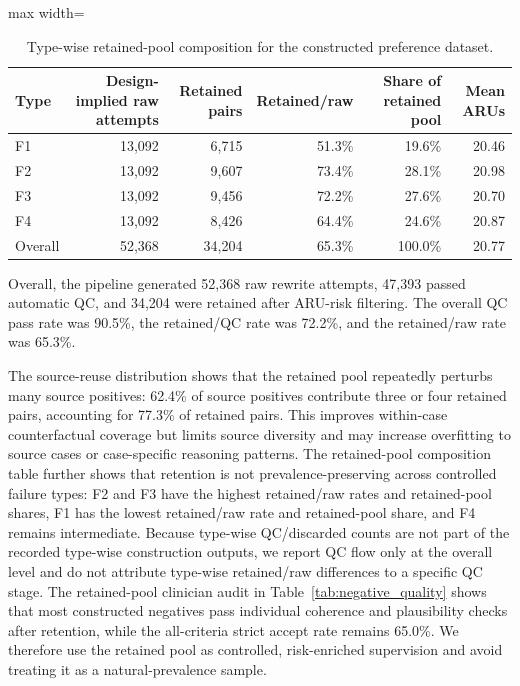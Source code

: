 \documentclass[a4paper,fleqn,doubleblind]{cas-sc}
\begin{document}
\begin{table}[htbp]
    \centering
    \footnotesize
    \caption{Type-wise retained-pool composition for the constructed preference dataset.}
    \label{tab:dataset_bias_retention}
    \begin{adjustbox}{max width=\textwidth}
    \begin{tabular}{lrrrrr}
        \toprule
        \textbf{Type} & \textbf{Design-implied raw attempts} & \textbf{Retained pairs} & \textbf{Retained/raw} & \textbf{Share of retained pool} & \textbf{Mean ARUs} \\
        \midrule
        F1 & 13,092 & 6,715 & 51.3\% & 19.6\% & 20.46 \\
        F2 & 13,092 & 9,607 & 73.4\% & 28.1\% & 20.98 \\
        F3 & 13,092 & 9,456 & 72.2\% & 27.6\% & 20.70 \\
        F4 & 13,092 & 8,426 & 64.4\% & 24.6\% & 20.87 \\
        \midrule
        Overall & 52,368 & 34,204 & 65.3\% & 100.0\% & 20.77 \\
        \bottomrule
    \end{tabular}
    \end{adjustbox}
\end{table}

Overall, the pipeline generated 52,368 raw rewrite attempts, 47,393 passed automatic QC, and 34,204 were retained after ARU-risk filtering. The overall QC pass rate was 90.5\%, the retained/QC rate was 72.2\%, and the retained/raw rate was 65.3\%.

The source-reuse distribution shows that the retained pool repeatedly perturbs many source positives: 62.4\% of source positives contribute three or four retained pairs, accounting for 77.3\% of retained pairs. This improves within-case counterfactual coverage but limits source diversity and may increase overfitting to source cases or case-specific reasoning patterns. The retained-pool composition table further shows that retention is not prevalence-preserving across controlled failure types: F2 and F3 have the highest retained/raw rates and retained-pool shares, F1 has the lowest retained/raw rate and retained-pool share, and F4 remains intermediate. Because type-wise QC/discarded counts are not part of the recorded type-wise construction outputs, we report QC flow only at the overall level and do not attribute type-wise retained/raw differences to a specific QC stage. The retained-pool clinician audit in Table~\ref{tab:negative_quality} shows that most constructed negatives pass individual coherence and plausibility checks after retention, while the all-criteria strict accept rate remains 65.0\%. We therefore use the retained pool as controlled, risk-enriched supervision and avoid treating it as a natural-prevalence sample.
\end{document}
